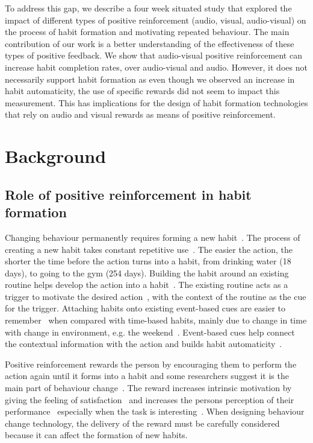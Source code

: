 \documentclass{scaffold/sigchi}
\begin{document}
To address this gap, we describe a four week situated study that explored the impact of different types of positive reinforcement (audio, visual, audio-visual) on the process of habit formation and motivating repeated behaviour. The main contribution of our work is a better understanding of the effectiveness of these types of positive feedback. We show that audio-visual positive reinforcement can increase habit completion rates, over audio-visual and audio. However, it does not necessarily support habit formation as even though we observed an increase in habit automaticity, the use of specific rewards did not seem to impact this measurement. This has implications for the design of habit formation technologies that rely on audio and visual rewards as means of positive reinforcement.

\section{Background}
\subsection{Role of positive reinforcement in habit formation}
Changing behaviour permanently requires forming a new habit~\cite{article_experiences_of_habit_formation}. The process of creating a new habit takes constant repetitive use~\cite{article_how_habits_formed_modelling_habit_formation}. The easier the action, the shorter the time before the action turns into a habit, from drinking water (18 days), to going to the gym (254 days). Building the habit around an existing routine helps develop the action into a habit~\cite{habits_event_cues_1}. The existing routine acts as a trigger to motivate the desired action~\cite{habits_event_cues_2}, with the context of the routine as the cue for the trigger. Attaching habits onto existing event-based cues are easier to remember~\cite{article_implementation_intentions_multicue} when compared with time-based habits, mainly due to change in time with change in environment, e.g. the weekend~\cite{coaching_not_that_good}. Event-based cues help connect the contextual information with the action and builds habit automaticity~\cite{article_implementation_intentions}.

Positive reinforcement rewards the person by encouraging them to perform the action again until it forms into a habit and some researchers suggest it is the main part of behaviour change~\cite{article_a_self_efficacy}. The reward increases intrinsic motivation by giving the feeling of satisfaction~\cite{article_promoting_habit_formation} and increases the persons perception of their performance~\cite{positive_reinforcement_pro} especially when the task is interesting~\cite{article_meta_analytic_review_intrinsic_motivation}. When designing behaviour change technology, the delivery of the reward must be carefully considered because it can affect the formation of new habits.
\end{document}
